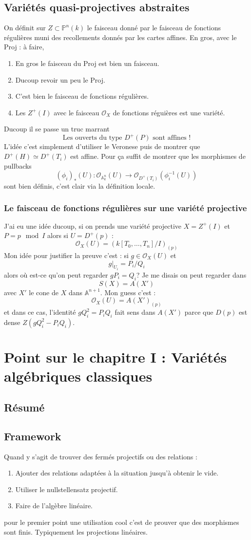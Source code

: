 \documentclass[a4paper,12pt]{book}
\newcommand{\A}{\mathbb{A}}
\newcommand{\Or}{\mathcal{O}}
\renewcommand{\P}{\mathbb{P}}
\theoremstyle{plain}
\theoremstyle{definition}
\theoremstyle{remark}
\begin{document}
\section{Variétés quasi-projectives abstraites}
On définit sur $Z\subset \P^n(k)$ le faisceau donné par le faisceau
de fonctions régulières muni des recollements donnés par les cartes 
affines. En gros, avec le Proj : à faire,
\begin{enumerate}
    \item En gros le faisceau du Proj est bien un faisceau.
    \item Ducoup revoir un peu le Proj.
    \item C'est bien le faisceau de fonctions régulières.
    \item Les $Z^+(I)$ avec le faisceau $\Or_X$ de fonctions réguières
	est une variété.
\end{enumerate}
Ducoup il se passe un truc marrant
\[\textrm{Les ouverts du type $D^+(P)$ sont affines !}\]
L'idée c'est simplement d'utiliser le Veronese puis de montrer que 
$D^+(H)\simeq D^+(T_i)$ est affine. Pour ça suffit de montrer que
les morphismes de pullbacks 
\[(\phi_i)_*(U)\colon \Or_{\A^n_k}(U)\to \Or_{D^+(T_i)}(\phi_i^{-1}(U))\]
sont bien définis, c'est clair via la définition locale.  
\subsection{Le faisceau de fonctions régulières sur une variété
projective}
J'ai eu une idée ducoup, si on prends une variété projective $X=Z^+(I)$
et $P=p\mod I$ alors si $U=D^+(p)$ :
\[\Or_X(U)=(k[T_0,\ldots, T_n]/I)_{(p)}\]
Mon idée pour justifier la preuve c'est : si $g\in \Or_X(U)$ et 
\[g|_{U_i}=P_i/Q_i\]
 alors où est-ce qu'on peut regarder $gP_i=Q_i$? Je me disais on peut 
 regarder dans 
 \[S(X)=A(X')\]
 avec $X'$ le cone de $X$ dans $\A^{n+1}$. Mon guess c'est :
\[\Or_X(U)=A(X')_{(p)}\]
et dans ce cas, l'identité $gQ_i^2=P_iQ_i$ fait sens dans $A(X')$
parce que $D(p)$ est dense $Z(gQ_i^2-P_iQ_i)$.


\chapter{Point sur le chapitre I : Variétés algébriques classiques}
\section{Résumé}
\section{Framework}
Quand y s'agit de trouver des fermés projectifs ou des relations :
\begin{enumerate}
    \item Ajouter des relations adaptées à la situation jusqu'à obtenir
	le vide.
    \item Utiliser le nullstellensatz projectif.
    \item Faire de l'algèbre linéaire.
\end{enumerate}
pour le premier point une utilisation cool c'est de prouver que des
morphismes sont finis. Typiquement les projections linéaires.
\end{document}

